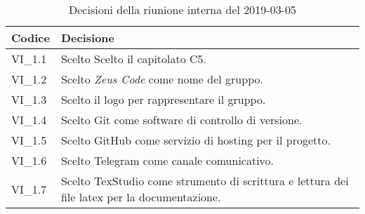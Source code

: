 	\begin{longtable}{ >{\centering}p{} >{}p{}}
		\caption{Decisioni della riunione interna del 2019-03-05}\\	
		\rowcolorhead
		\textbf{\color{white}Codice} 
		& \centering\textbf{\color{white}Decisione} 
		\tabularnewline 
		\endfirsthead
		VI\_1.1 & Scelto Scelto il capitolato C5.
		
		\tabularnewline 
		VI\_1.2 & Scelto \textit{Zeus Code} come nome del gruppo.
		
		\tabularnewline 
		VI\_1.3 & Scelto il logo per rappresentare il gruppo.
	
		\tabularnewline 
		VI\_1.4 & Scelto Git come software di controllo di versione.
		
		\tabularnewline 
		VI\_1.5 & Scelto GitHub come servizio di hosting per il progetto.
		
		\tabularnewline 
		VI\_1.6 & Scelto Telegram come canale comunicativo.
	
		\tabularnewline 
		VI\_1.7 & Scelto TexStudio come strumento di scrittura e lettura dei file latex per la documentazione.
	
	\end{longtable}
	




